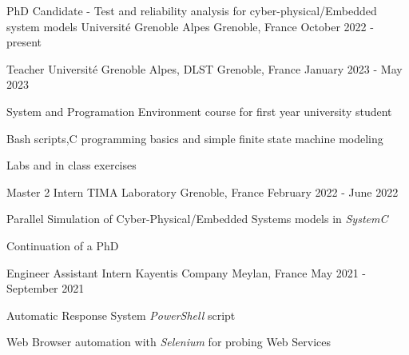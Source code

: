 

\begin{cventries}

	\cventry
	{PhD Candidate - Test and reliability analysis for cyber-physical/Embedded system models} %
	{Université Grenoble Alpes} %
	{Grenoble, France} %
	{October 2022 - present} %
	{
	}

	\cventry
	{Teacher} %
	{Université Grenoble Alpes, DLST} %
	{Grenoble, France} %
	{January 2023 - May 2023} %
	{
		\begin{cvitems} %
		\item{System and Programation Environment course for first year university student}
		\item{Bash scripts,C programming basics and simple finite state machine modeling}
		\item{Labs and in class exercises}
		\end{cvitems}
	}

	\cventry
	{Master 2 Intern} %
	{TIMA Laboratory} %
	{Grenoble, France} %
	{February 2022 - June 2022} %
	{
		\begin{cvitems} %
		\item{Parallel Simulation of Cyber-Physical/Embedded Systems models in \emph{SystemC}}
		\item{Continuation of a PhD}
		\end{cvitems}
	}

	\cventry
	{Engineer Assistant Intern} %
	{Kayentis Company} %
	{Meylan, France} %
	{May 2021 - September 2021} %
	{
		\begin{cvitems} %
		\item {Automatic Response System \emph{PowerShell} script}
		\item {Web Browser automation with \emph{Selenium} for probing Web Services}
		\end{cvitems}
	}


\end{cventries}
